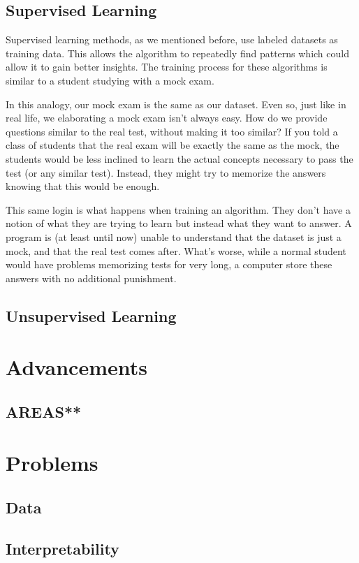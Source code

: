 \documentclass{book}
\begin{document}
\begin{appendices}
\subsection{Supervised Learning}
\qquad Supervised learning methods, as we mentioned before, use labeled datasets as training data.
This allows the algorithm to repeatedly find patterns which could allow it to gain better insights.
The training process for these algorithms is similar to a student studying with a mock exam.
\par
In this analogy, our mock exam is the same as our dataset.
Even so, just like in real life, we elaborating a mock exam isn't always easy. How do we provide questions similar to the real test, without making it too similar?
If you told a class of students that the real exam will be exactly the same as the mock, the students would be less inclined to learn the actual concepts necessary to pass the test (or any similar test).
Instead, they might try to memorize the answers knowing that this would be enough.
\par
This same login is what happens when training an algorithm.
They don't have a notion of what they are trying to learn but instead what they want to answer.
A program is (at least until now) unable to understand that the dataset is just a mock, and that the real test comes after.
What's worse, while a normal student would have problems memorizing tests for very long, a computer store these answers with no additional punishment.
\subsection{Unsupervised Learning}
\section{Advancements}
\subsection{AREAS**}
\section{Problems}
\subsection{Data}
\subsection{Interpretability}

\end{appendices}
\end{document}
